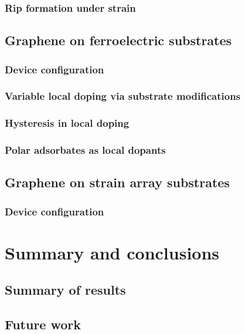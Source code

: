 \documentclass[edeposit,fullpage,draftthesis]{uiucthesis2009}
\begin{document}
    \subsection{Rip formation under strain}

\section{Graphene on ferroelectric substrates}
    \subsection{Device configuration}
    \subsection{Variable local doping via substrate modifications}
    \subsection{Hysteresis in local doping}
    \subsection{Polar adsorbates as local dopants}

\section{Graphene on strain array substrates}
    \subsection{Device configuration}


\chapter{Summary and conclusions}
\section{Summary of results}
\section{Future work}
\end{document}

